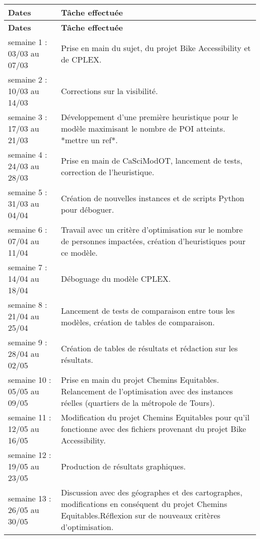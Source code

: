\begin{longtable}[H]{| m{5cm} | m{10cm} |}
\hline
\textbf{Dates} & \textbf{Tâche effectuée}\\
\hline
\endfirsthead

\hline
\textbf{Dates} & \textbf{Tâche effectuée}\\
\hline
\endhead

\hline
\endfoot

\hline
\endlastfoot

semaine 1 : 03/03 au 07/03 & Prise en main du sujet, du projet Bike Accessibility et de CPLEX. \\
\hline
semaine 2 : 10/03 au 14/03 & Corrections sur la visibilité.\\
\hline
semaine 3 : 17/03 au 21/03 & Développement d'une première heuristique pour le modèle maximisant le nombre de POI atteints. *mettre un ref*.\\
\hline
semaine 4 : 24/03 au 28/03 & Prise en main de CaSciModOT, lancement de tests, correction de l'heuristique.\\
\hline
semaine 5 : 31/03 au 04/04 & Création de nouvelles instances et de scripts Python pour déboguer.\\
\hline
semaine 6 : 07/04 au 11/04 & Travail avec un critère d'optimisation sur le nombre de personnes impactées, création d'heuristiques pour ce modèle. \\
\hline
semaine 7 : 14/04 au 18/04 & Déboguage du modèle CPLEX.\\
\hline
semaine 8 : 21/04 au 25/04 & Lancement de tests de comparaison entre tous les modèles, création de tables de comparaison.\\
\hline
semaine 9 : 28/04 au 02/05 & Création de tables de résultats et rédaction sur les résultats. \\
\hline
semaine 10 : 05/05 au 09/05 & Prise en main du projet Chemins Equitables. Relancement de l'optimisation avec des instances réelles (quartiers de la métropole de Tours). \\
\hline
semaine 11 : 12/05 au 16/05 & Modification du projet Chemins Equitables pour qu'il fonctionne avec des fichiers provenant du projet Bike Accessibility. \\
\hline
semaine 12 : 19/05 au 23/05 & Production de résultats graphiques. \\
\hline
semaine 13 : 26/05 au 30/05 & Discussion avec des géographes et des cartographes, modifications en conséquent du projet Chemins Equitables.Réflexion sur de nouveaux critères d'optimisation. \\

\end{longtable}

